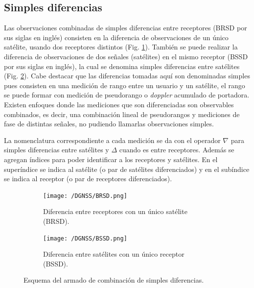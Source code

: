 \documentclass[a4paper,12pt,oneside,onecolumn,final,openright]{book}%
\begin{document}
\subsection{Simples diferencias}\label{sec:SD}
	Las observaciones combinadas de simples diferencias entre receptores (BRSD por sus siglas en inglés) consisten en la diferencia de observaciones de un único satélite, usando dos receptores distintos (Fig. \ref{fig:BRSD}). También se puede realizar la diferencia de observaciones de dos señales (satélites) en el mismo receptor (BSSD por sus siglas en inglés), la cual se denomina simples diferencias entre satélites (Fig. \ref{fig:BSSD}). Cabe destacar que las diferencias tomadas aquí son denominadas simples pues consisten en una medición de rango entre un usuario y un satélite, el rango se puede formar con medición de pseudorango o \textit{doppler} acumulado de portadora. Existen enfoques donde las mediciones que son diferenciadas son observables combinados, es decir, una combinación lineal de pseudorangos y mediciones de fase de distintas señales, no pudiendo llamarlas observaciones simples.

	La nomenclatura correspondiente a cada medición se da con el operador $\nabla$ para simples diferencias entre satélites y $\Delta$ cuando es entre receptores. Además se agregan índices para poder identificar a los receptores y satélites. En el superíndice se indica al satélite (o par de satélites diferenciados) y en el subíndice se indica al receptor (o par de receptores diferenciados).

\begin{figure}
    \begin{subfigure}{.49\textwidth}
    \centering
    \texttt{[image: /DGNSS/BRSD.png]}
    \caption{Diferencia entre receptores con un único satélite (BRSD).}
    \label{fig:BRSD}
    \end{subfigure}
    \begin{subfigure}{.49\textwidth}
      \centering
      \texttt{[image: /DGNSS/BSSD.png]}
      \caption{Diferencia entre satélites con un único receptor (BSSD).}
      \label{fig:BSSD}
    \end{subfigure}
    \caption{Esquema del armado de combinación de simples diferencias.}
    \label{fig:SimpleDiff}
\end{figure}
\end{document}
